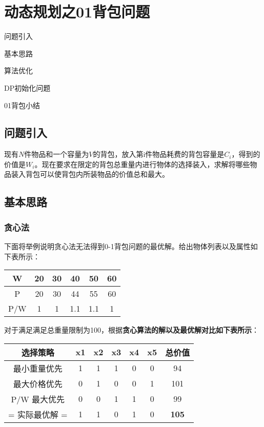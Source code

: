 \chapter{动态规划之01背包问题}

\begin{introduction}
	\item 问题引入
	\item 基本思路
	\item 算法优化
	\item DP初始化问题
	\item 01背包小结
\end{introduction}

\section{问题引入}
现有$N$件物品和一个容量为$V$的背包，放入第i件物品耗费的背包容量是$C_i$，得到的价值是$W_i$。现在要求在限定的背包总重量内进行物体的选择装入，求解将哪些物品装入背包可以使背包内所装物品的价值总和最大。
\section{基本思路}

\subsection{贪心法}
下面将举例说明贪心法无法得到0-1背包问题的最优解。给出物体列表以及属性如下表所示：

\begin{center}
\begin{tabular}{cccccc}
\toprule  %
W& 20& 30& 40& 50& 60\\
\midrule  %
P& 20& 30& 44& 55& 60\\
P/W& 1& 1& 1.1& 1.1& 1\\
\bottomrule %
\end{tabular}
\end{center}

对于满足满足总重量限制为100，根据\textbf{贪心算法的解以及最优解对比如下表所示}：

\begin{center}
\begin{tabular}{ccccccc}
\toprule  %
选择策略& x1& x2& x3& x4& x5& 总价值\\
\midrule  %
最小重量优先& 1& 1& 1& 0& 0& 94\\
最大价格优先& 0& 1& 0& 0& 1& 101\\
P/W 最大优先& 0& 0& 1& 1& 0& 99\\
= 实际最优解 =& 1& 1& 0& 1& 0& \textbf{105}\\ 
\bottomrule %
\end{tabular}
\end{center}

